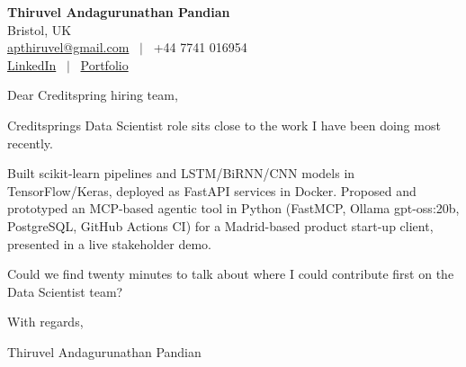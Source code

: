 \documentclass[11pt,a4paper]{article}
\begin{document}
\raggedright
\pagestyle{empty}

\begin{center}
    {\LARGE \color{linkblue} \textbf{Thiruvel Andagurunathan Pandian}}\\[0.2cm]
    Bristol, UK \\
    \href{mailto:apthiruvel@gmail.com}{apthiruvel@gmail.com} \ $|$ \ +44 7741 016954 \\
\href{https://www.linkedin.com/in/thiruvel-a-p/}{LinkedIn} \ $|$ \ \href{https://thiruvel-ap.github.io/PersonalPortfolio/}{Portfolio}
\end{center}

\vspace{0.4cm}

\noindent
Dear Creditspring hiring team,

Creditspring\textquotesingle{}s Data Scientist role sits close to the work I have been doing most recently.

Built scikit-learn pipelines and LSTM/BiRNN/CNN models in TensorFlow/Keras, deployed as FastAPI services in Docker. Proposed and prototyped an MCP-based agentic tool in Python (FastMCP, Ollama gpt-oss:20b, PostgreSQL, GitHub Actions CI) for a Madrid-based product start-up client, presented in a live stakeholder demo.

Could we find twenty minutes to talk about where I could contribute first on the Data Scientist team?

\vspace{0.5cm}

With regards,

Thiruvel Andagurunathan Pandian
\end{document}
